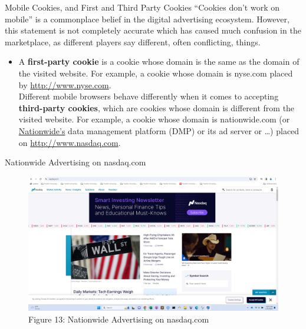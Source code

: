 \documentclass[pdf]{beamer}
\newcommand{\empr}[1]{{\color{franklinblue}\textbf{#1}}}
\theoremstyle{remark}
\theoremstyle{definition}
\begin{document}
\begin{frame}[t]{Mobile Cookies, and First and Third Party Cookies}
``Cookies don't work on mobile'' is a commonplace belief in the digital advertising ecosystem.
However, this statement is not completely accurate which has caused much confusion in the
marketplace, as different players say different, often conflicting, things. \\
\vspace{1.5ex}
\begin{itemize}
\item A \empr{first-party cookie} is a cookie whose domain is the same as the domain of the visited website. For example, a cookie whose domain is nyse.com placed by \href{https://www.nyse.com}{http://www.nyse.com}. \\
\vspace{1.5ex}
Different mobile browsers behave differently when it comes to accepting \empr{third-party cookies}, which are cookies whose domain is different from the visited website.  For example, a cookie whose domain is nationwide.com (or \href{https://www.nationwide.com/}{Nationwide's} data management platform (DMP) or its ad server or \ldots) placed on \href{https://www.nasdaq.com/}{http://www.nasdaq.com}.
\end{itemize}
\end{frame}

\begin{frame}[t]{Nationwide Advertising on nasdaq.com}
\begin{figure}[htbp]
    \centering
    \captionsetup{justification=centering}
    \includegraphics[clip, trim=0.0cm 0.0cm 0.0cm 0.0cm, width=1\textwidth]{Images/Nasdaq_Screenshot_2024_01_31_102418.png}  
    \caption{Figure {\color{franklinblue} 13}:  Nationwide Advertising on nasdaq.com}
    \label{fig:nyse}
\end{figure} 
\end{frame}
\end{document}

